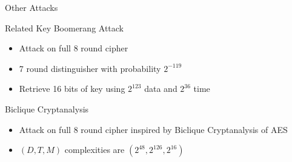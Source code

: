 \begin{frame}{Other Attacks}
  \begin{beamerboxesrounded}{Related Key Boomerang Attack}
    \begin{itemize}
      \item Attack on full 8 round cipher
      \item 7 round distinguisher with probability $2^{-119}$
      \item Retrieve 16 bits of key using $2^{123}$ data and $2^{36}$ time
    \end{itemize}
  \end{beamerboxesrounded}
  \vspace{5mm}
  \begin{beamerboxesrounded}{Biclique Cryptanalysis}
    \begin{itemize}
      \item Attack on full 8 round cipher inspired by Biclique Cryptanalysis of AES
      \item $(D,T,M)$ complexities are $(2^{48},2^{126},2^{16})$
    \end{itemize}
  \end{beamerboxesrounded}
\end{frame}